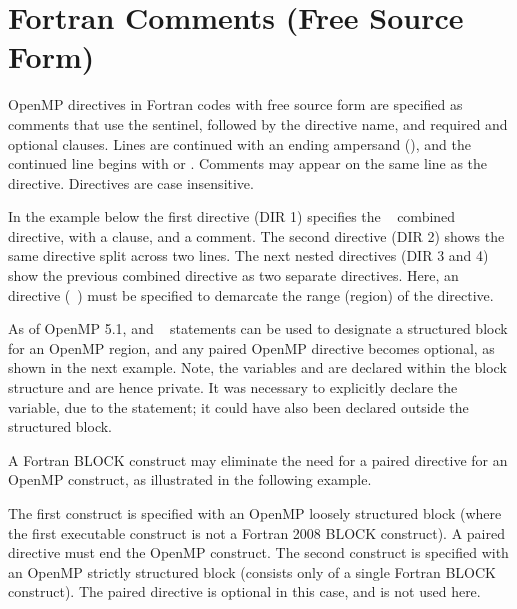 \section{Fortran Comments (Free Source Form)}
\label{sec:fortran_free_format_comments}

OpenMP directives in Fortran codes with free source form are specified as comments
that use the  sentinel, followed by the
directive name, and required and optional clauses.  Lines are continued with an ending ampersand (\code{\&}),
and the continued line begins with  or . Comments may appear on the
same line as the directive.  Directives are case insensitive.

In the example below the first directive (DIR 1) specifies the %
~ combined directive, with a  clause, and a comment.
The second directive (DIR 2) shows the same directive split across two lines. 
The next nested directives (DIR 3 and 4) show the previous combined directive as
two separate directives. 
Here, an  directive (~) must be specified to demarcate the range (region)
of the  directive. 

\clearpage

As of OpenMP 5.1,  and ~ statements can be used to designate 
a structured block for an OpenMP region, and any paired OpenMP  directive becomes optional,
as shown in the next example.  Note, the variables  and  are declared within the 
block structure and are hence private.
It was necessary to explicitly declare the  variable, due to the  statement; 
it could have also been declared outside the structured block.


A Fortran BLOCK construct may eliminate the need for a paired  directive for an OpenMP construct, 
as illustrated in the following example.

The first  construct is specified with an OpenMP loosely structured block 
(where the first executable construct is not a Fortran 2008 BLOCK construct). 
A paired  directive must end the OpenMP construct.
The second  construct is specified with an OpenMP strictly structured block 
(consists only of a single Fortran BLOCK construct). 
The paired  directive is optional in this case, and is not used here.

